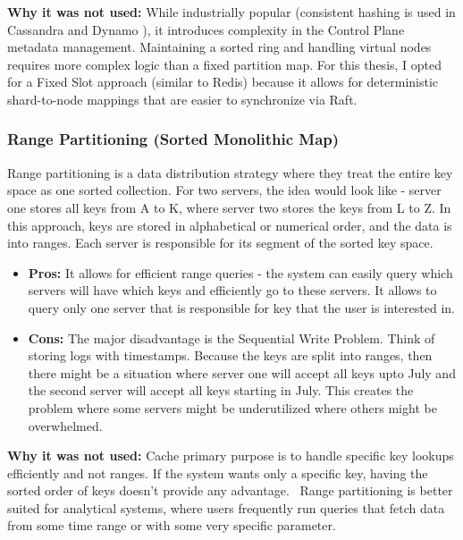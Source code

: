 \documentclass[shortabstract]{iithesis}
\begin{document}
\noindent \textbf{Why it was not used:} While industrially popular (consistent hashing is used in Cassandra \cite{cassandra} and Dynamo \cite{dynamo}), it introduces complexity in the Control Plane metadata management. Maintaining a sorted ring and handling virtual nodes requires more complex logic than a fixed partition map. For this thesis, I opted for a Fixed Slot approach (similar to Redis) because it allows for deterministic shard-to-node mappings that are easier to synchronize via Raft.

\subsubsection{Range Partitioning (Sorted Monolithic Map)}
Range partitioning is a data distribution strategy where they treat the entire key space as one sorted collection. For two servers, the idea would look like - server one stores all keys from A to K, where server two stores the keys from L to Z.
In this approach, keys are stored in alphabetical or numerical order, and the data is into ranges. Each server is responsible for its segment of the sorted key space. 
\begin{itemize}
    \item \textbf{Pros: } It allows for efficient range queries - the system can easily query which servers will have which keys and efficiently go to these servers. It allows to query only one server that is responsible for key that the user is interested in. 
    \item \textbf{Cons: } The major disadvantage is the Sequential Write Problem. Think of storing logs with timestamps. Because the keys are split into ranges, then there might be a situation where server one will accept all keys upto July and the second server will accept all keys starting in July. This creates the problem where some servers might be underutilized where others might be overwhelmed. 
\end{itemize}

\noindent \textbf{Why it was not used:} Cache primary purpose is to handle specific key lookups efficiently and not ranges. If the system wants only a specific key, having the sorted order of keys doesn't provide any advantage. \
Range partitioning is better suited for analytical systems, where users frequently run queries that fetch data from some time range or with some very specific parameter. 
\end{document}
